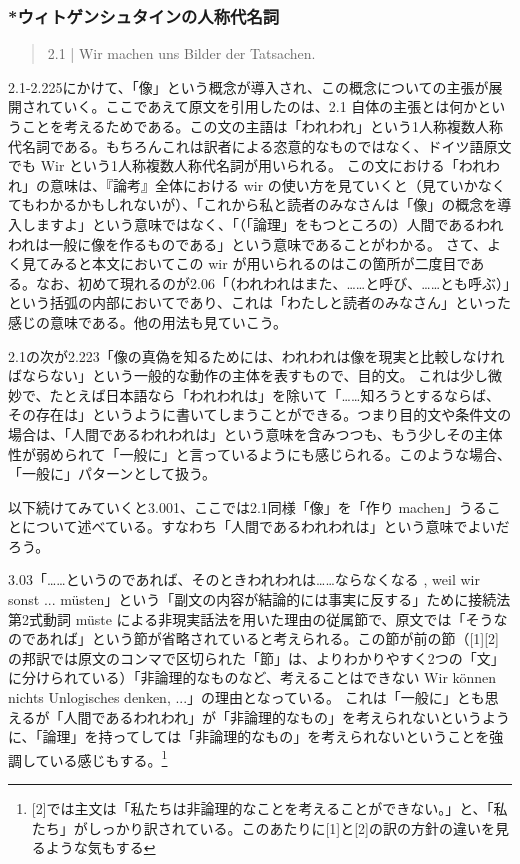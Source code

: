 \documentclass[11pt,a4paper]{jsarticle}
\begin{document}
{\small
\subsubsection*{*ウィトゲンシュタインの人称代名詞}
\begin{quote}
2.1 | Wir machen uns Bilder der Tatsachen.
\end{quote}

2.1-2.225にかけて、「像」という概念が導入され、この概念についての主張が展開されていく。ここであえて原文を引用したのは、2.1 自体の主張とは何かということを考えるためである。この文の主語は「われわれ」という1人称複数人称代名詞である。もちろんこれは訳者による恣意的なものではなく、ドイツ語原文でも Wir という1人称複数人称代名詞が用いられる。
この文における「われわれ」の意味は、『論考』全体における wir の使い方を見ていくと（見ていかなくてもわかるかもしれないが）、「これから私と読者のみなさんは「像」の概念を導入しますよ」という意味ではなく、「（「論理」をもつところの）人間であるわれわれは一般に像を作るものである」という意味であることがわかる。
さて、よく見てみると本文においてこの \frq{} wir \flq が用いられるのはこの箇所が二度目である。なお、初めて現れるのが2.06「（われわれはまた、……と呼び、……とも呼ぶ）」という括弧の内部においてであり、これは「わたしと読者のみなさん」といった感じの意味である。他の用法も見ていこう。

2.1の次が2.223「像の真偽を知るためには、われわれは像を現実と比較しなければならない」という一般的な動作の主体を表すもので、目的文。
これは少し微妙で、たとえば日本語なら「われわれは」を除いて「……知ろうとするならば、その存在は」というように書いてしまうことができる。つまり目的文や条件文の場合は、「人間であるわれわれは」という意味を含みつつも、もう少しその主体性が弱められて「一般に」と言っているようにも感じられる。このような場合、「一般に」パターンとして扱う。

以下続けてみていくと3.001、ここでは2.1同様「像」を「作り machen」うることについて述べている。すなわち「人間であるわれわれは」という意味でよいだろう。

3.03「……というのであれば、そのときわれわれは……ならなくなる , weil wir sonst ... m\"usten」という「副文の内容が結論的には事実に反する」ために接続法第2式動詞 m\"uste による非現実話法を用いた理由の従属節で、原文では「そうなのであれば」という節が省略されていると考えられる。この節が前の節（[1][2]の邦訳では原文のコンマで区切られた「節」は、よりわかりやすく2つの「文」に分けられている）「非論理的なものなど、考えることはできない Wir k\"onnen nichts Unlogisches denken, ...」の理由となっている。
これは「一般に」とも思えるが「人間であるわれわれ」が「非論理的なもの」を考えられないというように、「論理」を持ってしては「非論理的なもの」を考えられないということを強調している感じもする。\footnote{[2]では主文は「私たちは非論理的なことを考えることができない。」と、「私たち」がしっかり訳されている。このあたりに[1]と[2]の訳の方針の違いを見るような気もする}


}
\end{document}
